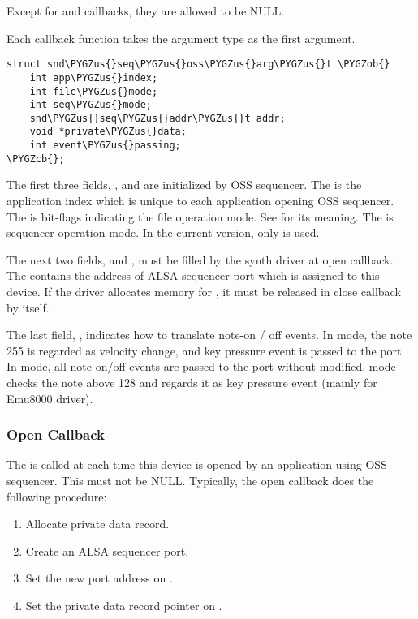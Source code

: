 \documentclass[a4paper,8pt,english]{sphinxmanual}
\def\PYGZus{\char`\_}
\def\PYGZob{\char`\{}
\def\PYGZcb{\char`\}}
\begin{document}
Except for  and  callbacks, they are allowed to be NULL.

Each callback function takes the argument type  as the
first argument.

\begin{Verbatim}[commandchars=\\\{\}]
struct snd\PYGZus{}seq\PYGZus{}oss\PYGZus{}arg\PYGZus{}t \PYGZob{}
    int app\PYGZus{}index;
    int file\PYGZus{}mode;
    int seq\PYGZus{}mode;
    snd\PYGZus{}seq\PYGZus{}addr\PYGZus{}t addr;
    void *private\PYGZus{}data;
    int event\PYGZus{}passing;
\PYGZcb{};
\end{Verbatim}

The first three fields, ,  and 
are initialized by OSS sequencer. The  is the application
index which is unique to each application opening OSS sequencer. The
 is bit-flags indicating the file operation mode. See
 for its meaning. The  is sequencer operation
mode. In the current version, only  is used.

The next two fields,  and , must be
filled by the synth driver at open callback. The  contains
the address of ALSA sequencer port which is assigned to this device. If
the driver allocates memory for , it must be released
in close callback by itself.

The last field, , indicates how to translate note-on
/ off events. In  mode, the note 255 is regarded
as velocity change, and key pressure event is passed to the port. In
 mode, all note on/off events are passed to the port
without modified.  mode checks the note above 128
and regards it as key pressure event (mainly for Emu8000 driver).


\subsubsection{Open Callback}
\label{sound/designs/seq-oss:open-callback}
The  is called at each time this device is opened by an application
using OSS sequencer. This must not be NULL. Typically, the open callback
does the following procedure:
\begin{enumerate}
\item {} 
Allocate private data record.

\item {} 
Create an ALSA sequencer port.

\item {} 
Set the new port address on .

\item {} 
Set the private data record pointer on .

\end{enumerate}
\end{document}
